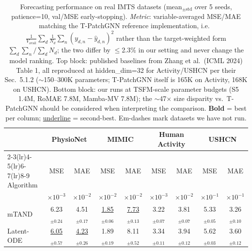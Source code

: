 
\begin{table}[t]
\caption{Forecasting performance on real IMTS datasets (mean$_{\pm\text{std}}$ over 5 seeds, patience=10, val/MSE early-stopping). \emph{Metric}: variable-averaged MSE/MAE matching the T-PatchGNN reference implementation, i.e.\ $\frac{1}{V_{\text{avail}}}\sum_d \frac{1}{N_d}\sum_n (y_{d,n}-\hat y_{d,n})^2$ rather than the target-weighted form $\sum_d\sum_n / \sum_d N_d$; the two differ by $\leq$2.3\% in our setting and never change the model ranking. Top block: published baselines from Zhang et al.\ (ICML 2024) Table 1, all reproduced at hidden\_dim=32 for Activity/USHCN per their Sec.~5.1.2 ($\sim$150--300K parameters; T-PatchGNN itself is 165K on Activity, 168K on USHCN). Bottom block: our runs at TSFM-scale parameter budgets (S5 1.4M, RoMAE 7.8M, Mamba-MV 7.8M); the $\sim$47$\times$ size disparity vs.\ T-PatchGNN should be considered when interpreting the comparison. \textbf{Bold} = best per column; \underline{underline} = second-best. Em-dashes mark datasets we have not run.}
\label{tab:imts_real_results}
\centering
\setlength{\tabcolsep}{3pt}
\renewcommand{\arraystretch}{1.05}
\footnotesize
\begin{tabular}{lcccccccc}
\toprule
& \multicolumn{2}{c}{PhysioNet} & \multicolumn{2}{c}{MIMIC} & \multicolumn{2}{c}{Human Activity} & \multicolumn{2}{c}{USHCN} \\
\cmidrule(lr){2-3}\cmidrule(lr){4-5}\cmidrule(lr){6-7}\cmidrule(lr){8-9}
Algorithm & MSE & MAE & MSE & MAE & MSE & MAE & MSE & MAE \\
& \scriptsize $\times 10^{-3}$ & \scriptsize $\times 10^{-2}$ & \scriptsize $\times 10^{-2}$ & \scriptsize $\times 10^{-2}$ & \scriptsize $\times 10^{-3}$ & \scriptsize $\times 10^{-2}$ & \scriptsize $\times 10^{-1}$ & \scriptsize $\times 10^{-1}$ \\
\midrule
mTAND        & 6.23$_{\pm 0.24}$ & 4.51$_{\pm 0.17}$ & \underline{1.85$_{\pm 0.06}$} & \underline{7.73$_{\pm 0.13}$} & 3.22$_{\pm 0.07}$ & 3.81$_{\pm 0.07}$ & 5.33$_{\pm 0.05}$ & 3.26$_{\pm 0.10}$ \\
Latent-ODE   & \underline{6.05$_{\pm 0.57}$} & \underline{4.23$_{\pm 0.26}$} & 1.89$_{\pm 0.19}$ & 8.11$_{\pm 0.52}$ & 3.34$_{\pm 0.11}$ & 3.94$_{\pm 0.12}$ & 5.62$_{\pm 0.03}$ & 3.60$_{\pm 0.12}$ \\

\end{tabular}
\end{table}
